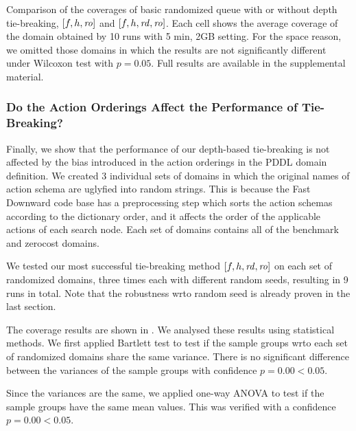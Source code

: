 \begin{table}[tb]
 \centering {}
 
 \caption{Comparison of the coverages of basic randomized queue with or
 without depth tie-breaking, $[f,h,\mbox{\textit{ro}}]$ and $[f,h,\mbox{\textit{rd}},\mbox{\textit{ro}}]$. Each cell
 shows the average coverage of the domain obtained by 10 runs with 5
 min, 2GB setting.  For the space reason, we omitted those domains in
 which the results are not significantly different under Wilcoxon test
 with $p=0.05$. Full results are available in the supplemental material.
 }  \label{r-vs-rd-random}
\end{table}

\subsubsection{Do the Action Orderings Affect the Performance of Tie-Breaking?}

Finally, we show that the performance of our depth-based tie-breaking is
not affected by the bias introduced in the action orderings in the PDDL
domain definition.  We created 3 individual sets of domains in which the
original names of action schema are uglyfied into random strings. This is because
the Fast Downward code base has a preprocessing
step which sorts the action schemas according to the dictionary
order, and it affects the order of the applicable actions of each search node.
Each set of domains contains all of the benchmark and zerocost
domains.

We tested our most successful tie-breaking method $[f,h,\mbox{\textit{rd}},\mbox{\textit{ro}}]$ on each
set of randomized domains, three times each with different random seeds,
resulting in 9 runs in total. Note that the robustness wrto random seed is
already proven in the last section.

The coverage results are shown in .
We analysed these results using statistical methods.
We first applied Bartlett test to test if the sample groups wrto each
set of randomized domains share the same variance.
There is no significant difference between the variances of the sample
groups with confidence $p=0.00 < 0.05$.

Since the variances are the same, we applied one-way ANOVA to test if
the sample groups have the same mean values.
This was verified with a confidence $p=0.00<0.05$.

